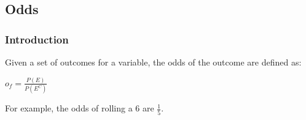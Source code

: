 
\subsection{Odds}

\subsubsection{Introduction}

Given a set of outcomes for a variable, the odds of the outcome are defined as:

\(o_f=\frac{P(E)}{P(E^C)}\)

For example, the odds of rolling a \(6\) are \(\frac{1}{5}\).

